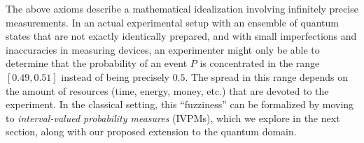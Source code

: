 \documentclass[english,reprint, aps, prl,superscriptaddress, showpacs,
showkeys, longbibliography, amsmath, amssymb, floatfix]{revtex4-1}
\theoremstyle{plain}
\theoremstyle{definition}
\newcommand{\proj}[1]{\op{#1}{#1}}
\newcommand{\ps}{\texttt{+}}
\newcommand{\rmi}{i}
\begin{document}
\begin{comment}
As an example, consider a three-dimensional Hilbert space with orthonormal
basis $\{\ket{0},\ket{1},\ket{2}\}$ and an observable $\mathbf{O}$
with spectral decomposition $\mathbf{O}=\proj{0}+2\,\proj{1}+3\,\proj{2}$,
i.e., $\lambda_{i}=i$ and $P_{i}=\proj{i-1}$. Two fragments of valid
probability measures~$\mu_{1}$ and $\mu_{2}$ that can be associated
with this space are defined in Table~\ref{tab:quantum-probability-measure}.
\begin{table}
\noindent \centering{}\caption{\label{tab:quantum-probability-measure}Two fragments of valid probability
measures~$\mu_{1}$ and $\mu_{2}$.}
\begin{tabular}{ccc}
\toprule 
\addlinespace
$\ket{\psi}$ & $\mu_{1}(\proj{\psi})$ & $\mu_{2}(\proj{\psi})$\tabularnewline\addlinespace
\midrule
\midrule 
\addlinespace
$\ket{0}$ & $\frac{1}{2}$ & $\frac{1}{2}$\tabularnewline\addlinespace
\midrule 
\addlinespace
$\ket{1}$ & $\frac{1}{2}$ & $0$\tabularnewline\addlinespace
\midrule 
\addlinespace
$\ket{2}$ & $0$ & $\frac{1}{2}$\tabularnewline\addlinespace
\midrule 
\addlinespace
$\ket{\ps}=\frac{\ket{0}+\ket{1}}{\sqrt{2}}$ & $1$ & $\frac{1}{4}$\tabularnewline\addlinespace
\midrule 
\addlinespace
$\ket{\rmi}=\frac{\ket{0}+\rmi\ket{1}}{\sqrt{2}}$ & $\frac{1}{2}$ & $\frac{1}{4}$\tabularnewline\addlinespace
\midrule 
\addlinespace
$\ket{\ps'}=\frac{\ket{0}+\ket{2}}{\sqrt{2}}$ & $\frac{1}{4}$ & $\frac{1}{2}$\tabularnewline\addlinespace
\midrule 
\addlinespace
$\ket{\rmi'}=\frac{\ket{0}+\rmi\ket{2}}{\sqrt{2}}$ & $\frac{1}{4}$ & $\frac{1}{2}$\tabularnewline\addlinespace
\midrule 
\addlinespace
$\ket{\ps''}=\frac{\ket{1}+\ket{2}}{\sqrt{2}}$ & $\frac{1}{4}$ & $\frac{1}{4}$\tabularnewline\addlinespace
\midrule 
\addlinespace
$\ket{\rmi''}=\frac{\ket{1}+\rmi\ket{2}}{\sqrt{2}}$ & $\frac{1}{4}$ & $\frac{1}{4}$\tabularnewline\addlinespace
\bottomrule
\end{tabular}
\end{table}
By the Born rule, the first probability measure corresponds to the
quantum system being in the pure state $\ket{\ps}=(\ket{0}+\ket{1})/\sqrt{2}$
and the second corresponds to the quantum system being in the state
$\rho=(\proj{0}+\proj{2})/2$. The expectation values of the observable
$\mathbf{O}$, $\expval{\mathbf{O}}_{\mu_{1,2}}$, are 1.5 in the
first case and 2 in the second.
\end{comment}

The above axioms describe a mathematical idealization involving
infinitely precise measurements. In an actual experimental setup with
an ensemble of quantum states that are not exactly identically
prepared, and with small imperfections and inaccuracies in measuring
devices, an experimenter might only be able to determine that the
probability of an event $P$ is concentrated in the range $[0.49,0.51]$
instead of being precisely $0.5$. The spread in this range depends on
the amount of resources (time, energy, money, etc.) that are
devoted to the experiment. In the classical setting, this
``fuzziness'' can be formalized by moving to \emph{interval-valued
  probability measures} (IVPMs), which we explore in the next section,
along with our proposed extension to the quantum domain.
\end{document}
